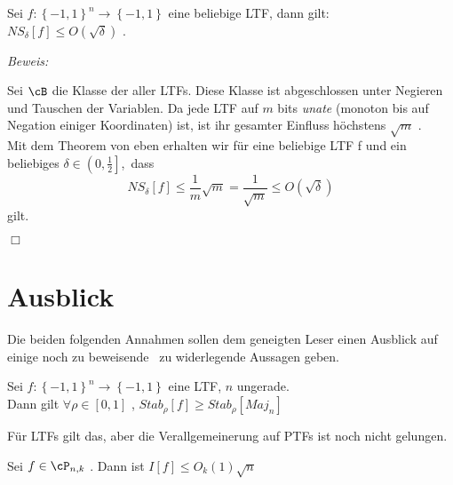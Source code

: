 \documentclass{article}
\newenvironment{proof}{
	\textit{Beweis: \\}
}{
	\begin{flushright}
		$\Box$ 
	\end{flushright}
}
\begin{document}
	 \begin{satz}\label{peres}
		 Sei $f:\left\lbrace -1 ,1 \right\rbrace^n \to \left\lbrace -1,1 \right\rbrace $ eine beliebige LTF, dann gilt:\\
		  $NS_\delta \left[ f \right] \le O( \sqrt{\delta }) $ .

	 \begin{proof}
		 Sei $\cB$ die Klasse der aller LTFs. Diese Klasse ist abgeschlossen unter Negieren und Tauschen der Variablen. 
		 Da jede LTF auf $m$ bits \textit{unate} (monoton bis auf Negation einiger Koordinaten) ist, ist ihr gesamter Einfluss  h\"ochstens $\sqrt{m}$ .\\
		 Mit dem Theorem von eben erhalten wir f\"ur eine beliebige LTF f und ein beliebiges $\delta \in \left(0, \frac{1}{2}\right] $,\ dass
		 \[
			 NS_\delta\left[ f \right] \le \frac{1}{m} \sqrt{m} =\frac{1}{\sqrt{m}} \le O(\sqrt{\delta})
		 \] gilt.
	 \end{proof}
	 	 	 \end{satz}
	 
	 \section{Ausblick}
	 Die beiden folgenden Annahmen sollen dem geneigten Leser einen Ausblick auf einige noch zu beweisende \bzw \ zu widerlegende Aussagen geben.
	\begin{annahme}
%		  
		Sei $ f: \left\lbrace -1,1 \right\rbrace^n \to \left\lbrace -1 ,1 \right\rbrace$ eine LTF, $n$ ungerade. \\
		Dann gilt $ \forall \rho \in \left[0,1 \right] $ , $ Stab_\rho \left[f \right] \ge Stab_\rho \left[ Maj_n \right] $
	\end{annahme}
	F\"ur LTFs gilt das, aber die Verallgemeinerung auf PTFs ist noch nicht gelungen.
%	
	\begin{annahme}
		Sei $f \in \cP_{n,k}$ . Dann ist $I[f] \le O_k(1)\sqrt{n}$
	\end{annahme}
	
	
\end{document}
